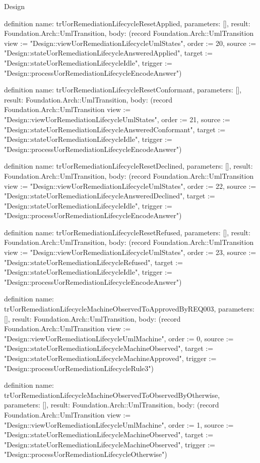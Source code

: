 \begin{lexlean}{Design}
\begin{semanticmodule}
definition{
  name: trUorRemediationLifecycleResetApplied,
  parameters: [],
  result: Foundation.Arch::UmlTransition,
  body: (record Foundation.Arch::UmlTransition {view := "Design::viewUorRemediationLifecycleUmlStates", order := 20, source := "Design::stateUorRemediationLifecycleAnsweredApplied", target := "Design::stateUorRemediationLifecycleIdle", trigger := "Design::processUorRemediationLifecycleEncodeAnswer"})
}

definition{
  name: trUorRemediationLifecycleResetConformant,
  parameters: [],
  result: Foundation.Arch::UmlTransition,
  body: (record Foundation.Arch::UmlTransition {view := "Design::viewUorRemediationLifecycleUmlStates", order := 21, source := "Design::stateUorRemediationLifecycleAnsweredConformant", target := "Design::stateUorRemediationLifecycleIdle", trigger := "Design::processUorRemediationLifecycleEncodeAnswer"})
}

definition{
  name: trUorRemediationLifecycleResetDeclined,
  parameters: [],
  result: Foundation.Arch::UmlTransition,
  body: (record Foundation.Arch::UmlTransition {view := "Design::viewUorRemediationLifecycleUmlStates", order := 22, source := "Design::stateUorRemediationLifecycleAnsweredDeclined", target := "Design::stateUorRemediationLifecycleIdle", trigger := "Design::processUorRemediationLifecycleEncodeAnswer"})
}

definition{
  name: trUorRemediationLifecycleResetRefused,
  parameters: [],
  result: Foundation.Arch::UmlTransition,
  body: (record Foundation.Arch::UmlTransition {view := "Design::viewUorRemediationLifecycleUmlStates", order := 23, source := "Design::stateUorRemediationLifecycleRefused", target := "Design::stateUorRemediationLifecycleIdle", trigger := "Design::processUorRemediationLifecycleEncodeAnswer"})
}

definition{
  name: trUorRemediationLifecycleMachineObservedToApprovedByREQ003,
  parameters: [],
  result: Foundation.Arch::UmlTransition,
  body: (record Foundation.Arch::UmlTransition {view := "Design::viewUorRemediationLifecycleUmlMachine", order := 0, source := "Design::stateUorRemediationLifecycleMachineObserved", target := "Design::stateUorRemediationLifecycleMachineApproved", trigger := "Design::processUorRemediationLifecycleRule3"})
}

definition{
  name: trUorRemediationLifecycleMachineObservedToObservedByOtherwise,
  parameters: [],
  result: Foundation.Arch::UmlTransition,
  body: (record Foundation.Arch::UmlTransition {view := "Design::viewUorRemediationLifecycleUmlMachine", order := 1, source := "Design::stateUorRemediationLifecycleMachineObserved", target := "Design::stateUorRemediationLifecycleMachineObserved", trigger := "Design::processUorRemediationLifecycleOtherwise"})
}


\end{semanticmodule}
\end{lexlean}
